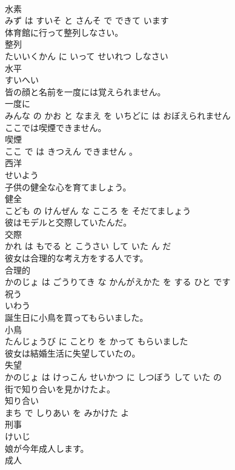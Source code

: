 \documentclass[8pt]{extreport}
\begin{document}
\begin{CJK}{UTF8}{min}
\\	水素 
\\	みず は すいそ と さんそ で できて います			
\\	体育館に行って整列しなさい。	
\\	整列 
\\	たいいくかん に いって せいれつ しなさい			
\\	水平	
\\	すいへい			
\\	皆の顔と名前を一度には覚えられません。	
\\	一度に 
\\	みんな の かお と なまえ を いちどに は おぼえられません			
\\	ここでは喫煙できません。	
\\	喫煙 
\\	ここ で は きつえん できません 。			
\\	西洋	
\\	せいよう			
\\	子供の健全な心を育てましょう。	
\\	健全 
\\	こども の けんぜん な こころ を そだてましょう			
\\	彼はモデルと交際していたんだ。	
\\	交際 
\\	かれ は もでる と こうさい して いた ん だ			
\\	彼女は合理的な考え方をする人です。	
\\	合理的 
\\	かのじょ は ごうりてき な かんがえかた を する ひと です			
\\	祝う	
\\	いわう			
\\	誕生日に小鳥を買ってもらいました。	
\\	小鳥 
\\	たんじょうび に ことり を かって もらいました			
\\	彼女は結婚生活に失望していたの。	
\\	失望 
\\	かのじょ は けっこん せいかつ に しつぼう して いた の			
\\	街で知り合いを見かけたよ。	
\\	知り合い 
\\	まち で しりあい を みかけた よ			
\\	刑事	
\\	けいじ			
\\	娘が今年成人します。	
\\	成人 

\end{CJK}
\end{document}
